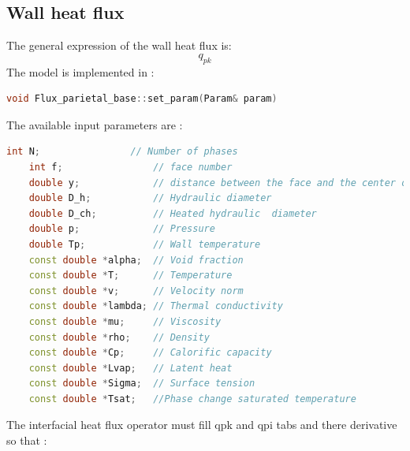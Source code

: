 \subsection{Wall heat flux}
The general expression of the wall heat flux is:
\begin{equation}
    q_{pk}
\end{equation}
The model is implemented in :
\begin{lstlisting}[language=c++]
void Flux_parietal_base::set_param(Param& param)
\end{lstlisting}
The available input parameters are :
\begin{lstlisting}[language=c++]
    int N;                // Number of phases
    int f;                // face number
    double y;             // distance between the face and the center of gravity of the cell
    double D_h;           // Hydraulic diameter
    double D_ch;          // Heated hydraulic  diameter
    double p;             // Pressure
    double Tp;            // Wall temperature
    const double *alpha;  // Void fraction
    const double *T;      // Temperature
    const double *v;      // Velocity norm
    const double *lambda; // Thermal conductivity
    const double *mu;     // Viscosity
    const double *rho;    // Density
    const double *Cp;     // Calorific capacity
    const double *Lvap;   // Latent heat
    const double *Sigma;  // Surface tension
    const double *Tsat;   //Phase change saturated temperature
\end{lstlisting}
The interfacial heat flux operator must fill qpk and qpi tabs and there derivative so that :
